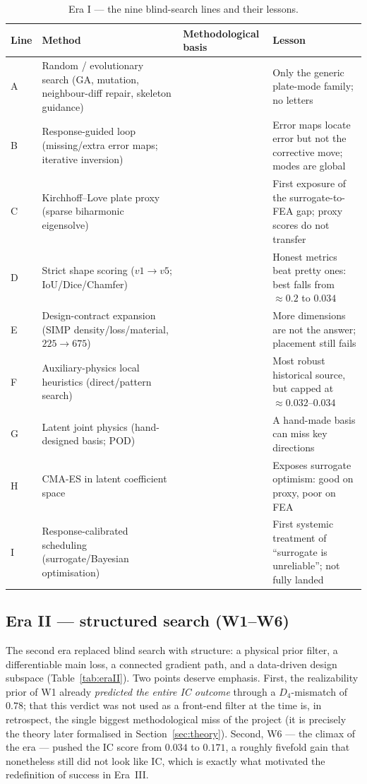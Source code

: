 \documentclass[11pt,a4paper]{article}
\newcommand{\Dfour}{D_4}
\begin{document}
\begin{table}[h]
\centering
\caption{Era I --- the nine blind-search lines and their lessons.}
\label{tab:eraI}
\small
\begin{tabular}{@{}p{0.7cm}p{5.3cm}p{2.2cm}p{6.8cm}@{}}
\toprule
Line & Method & Methodological basis & Lesson \\
\midrule
A & Random / evolutionary search (GA, mutation, neighbour-diff repair, skeleton guidance) & \cite{holland1975,bendsoe2003} & Only the generic plate-mode family; no letters \\
B & Response-guided loop (missing/extra error maps; iterative inversion) & \cite{tarantola2005} & Error maps locate error but not the corrective move; modes are global \\
C & Kirchhoff--Love plate proxy (sparse biharmonic eigensolve) & \cite{leissa1969,waller1939} & First exposure of the surrogate-to-FEA gap; proxy scores do not transfer \\
D & Strict shape scoring ($v1\to v5$; IoU/Dice/Chamfer) & \cite{jaccard1912,dice1945,barrow1977} & Honest metrics beat pretty ones: best falls from $\approx0.2$ to $0.034$ \\
E & Design-contract expansion (SIMP density/loss/material, $225\to675$) & \cite{bendsoe1989,bendsoe1999} & More dimensions are not the answer; placement still fails \\
F & Auxiliary-physics local heuristics (direct/pattern search) & \cite{hooke1961} & Most robust historical source, but capped at $\approx0.032$--$0.034$ \\
G & Latent joint physics (hand-designed basis; POD) & \cite{berkooz1993} & A hand-made basis can miss key directions \\
H & CMA-ES in latent coefficient space & \cite{hansen2001} & Exposes surrogate optimism: good on proxy, poor on FEA \\
I & Response-calibrated scheduling (surrogate/Bayesian optimisation) & \cite{jones1998,shahriari2016} & First systemic treatment of ``surrogate is unreliable''; not fully landed \\
\bottomrule
\end{tabular}
\end{table}

\subsection{Era II --- structured search (W1--W6)}\label{sec:eraII}
The second era replaced blind search with structure: a physical prior filter, a
differentiable main loss, a connected gradient path, and a data-driven design
subspace (Table~\ref{tab:eraII}). Two points deserve emphasis. First, the
realizability prior of W1 already \emph{predicted the entire IC outcome} through a
$\Dfour$-mismatch of $0.78$; that this verdict was not used as a front-end filter
at the time is, in retrospect, the single biggest methodological miss of the
project (it is precisely the theory later formalised in
Section~\ref{sec:theory}). Second, W6 --- the climax of the era --- pushed the IC
score from $0.034$ to $0.171$, a roughly fivefold gain that nonetheless still did
not look like IC, which is exactly what motivated the redefinition of success in
Era~III.
\end{document}
